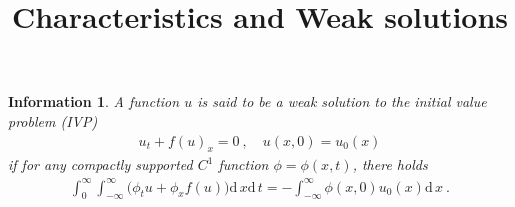 \documentclass[10pt,letterpaper]{article}
\title{Characteristics and Weak solutions}
\date{}
\newcommand{\dif}[1][]{\mathrm{d} {#1}\,}
\theoremstyle{break}
\newtheorem*{information}{Information}
\begin{document}
\maketitle

\begin{information}
	A function $u$ is said to be a \emph{weak solution} to the initial value problem (IVP)
	\begin{gather} \label{conLaw}
		u_t+f(u)_x=0\ ,
		\quad
		u(x,0)=u_0(x)
	\end{gather}%
	if for any compactly supported $C^1$ function $\phi=\phi(x,t)$, there holds
	\begin{gather}%
		\int_0^\infty \int_{-\infty}^\infty \Big( \phi_t u +\phi_x f(u)\Big)\dif x\dif t
		=
		-\int_{-\infty}^\infty \phi(x,0)u_0(x)\dif x\ .
	\end{gather}%
\end{information}
\end{document}
